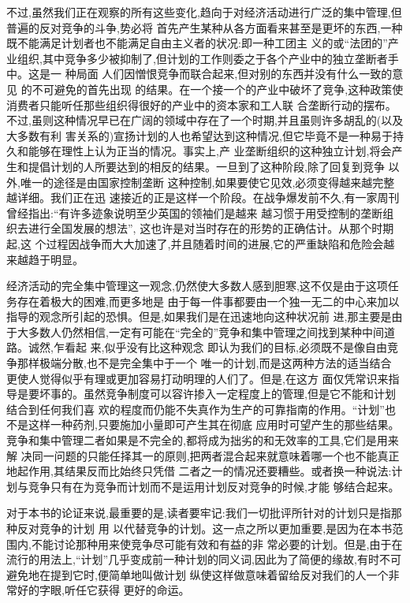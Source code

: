 ﻿\documentclass[12pt]{article}
\begin{document}
不过,虽然我们正在观察的所有这些变化,趋向于对经济活动进行广泛的集中管理,但普遍的反对竞争的斗争,势必将
首先产生某种从各方面看来甚至是更坏的东西,一种既不能满足计划者也不能满足自由主义者的状况:即一种工团主
义的或``法团的''产业组织,其中竞争多少被抑制了,但计划的工作则委之于各个产业中的独立垄断者手中。这是一
种局面 \myrule 人们因憎恨竞争而联合起来,但对别的东西并没有什么一致的意见 \myrule 的不可避免的首先出现
的结果。在一个接一个的产业中破坏了竞争,这种政策使消费者只能听任那些组织得很好的产业中的资本家和工人联
合垄断行动的摆布。不过,虽则这种情况早已在广阔的领域中存在了一个时期,并且虽则许多胡乱的(以及大多数有利
害关系的)宣扬计划的人也希望达到这种情况,但它毕竟不是一种易于持久和能够在理性上认为正当的情况。事实上,产
业垄断组织的这种独立计划,将会产生和提倡计划的人所要达到的相反的结果。一旦到了这种阶段,除了回复到竞争
以外,唯一的途径是由国家控制垄断 \myrule 这种控制,如果要使它见效,必须变得越来越完整越详细。我们正在迅
速接近的正是这样一个阶段。在战争爆发前不久,有一家周刊曾经指出:``有许多迹象说明至少英国的领袖们是越来
越习惯于用受控制的垄断组织去进行全国发展的想法'', 这也许是对当时存在的形势的正确估计。从那个时期起,这
个过程因战争而大大加速了,并且随着时间的进展,它的严重缺陷和危险会越来越趋于明显。

经济活动的完全集中管理这一观念,仍然使大多数人感到胆寒,这不仅是由于这项任务存在着极大的困难,而更多地是
由于每一件事都要由一个独一无二的中心来加以指导的观念所引起的恐惧。但是,如果我们是在迅速地向这种状况前
进,那主要是由于大多数人仍然相信,一定有可能在``完全的''竞争和集中管理之间找到某种中间道路。诚然,乍看起
来,似乎没有比这种观念 \myrule 即认为我们的目标,必须既不是像自由竞争那样极端分散,也不是完全集中于一个
唯一的计划,而是这两种方法的适当结合 \myrule 更使人觉得似乎有理或更加容易打动明理的人们了。但是,在这方
面仅凭常识来指导是要坏事的。虽然竞争制度可以容许掺入一定程度上的管理,但是它不能和计划结合到任何我们喜
欢的程度而仍能不失真作为生产的可靠指南的作用。``计划''也不是这样一种药剂,只要施加小量即可产生其在彻底
应用时可望产生的那些结果。竞争和集中管理二者如果是不完全的,都将成为拙劣的和无效率的工具,它们是用来解
决同一问题的只能任择其一的原则,把两者混合起来就意味着哪一个也不能真正地起作用,其结果反而比始终只凭借
二者之一的情况还要糟些。或者换一种说法:计划与竞争只有在为竞争而计划而不是运用计划反对竞争的时候,才能
够结合起来。

对于本书的论证来说,最重要的是,读者要牢记:我们一切批评所针对的计划只是指那种反对竞争的计划 \myrule 用
以代替竞争的计划。这一点之所以更加重要,是因为在本书范围内,不能讨论那种用来使竞争尽可能有效和有益的非
常必要的计划。但是,由于在流行的用法上,``计划''几乎变成前一种计划的同义词,因此为了简便的缘故,有时不可
避免地在提到它时,便简单地叫做计划 \myrule 纵使这样做意味着留给反对我们的人一个非常好的字眼,听任它获得
更好的命运。
\end{document}
